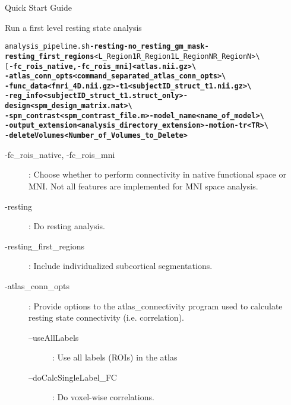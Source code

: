 \documentclass[]{report}
\begin{document}
\begin{chapter}{Quick Start Guide }
\begin{section}{Run a first level resting state analysis}
\
\begin{alltt}
analysis\_pipeline.sh  {\bf-resting  -no_resting_gm_mask -resting\_first\_regions } <L_Region1 R_Region1 L_RegionN R_RegionN>  \textbackslash \\
\hspace*{0.5in}  [ \bf-fc\_rois\_native, -fc\_rois\_mni ]  <atlas.nii.gz>  \textbackslash \\
\hspace*{0.5in}  {\bf -atlas\_conn\_opts } <command\_separated\_atlas\_conn\_opts>  \textbackslash \\
\hspace*{0.5in}  -func\_data <fmri\_4D.nii.gz>   -t1 <subjectID\_struct\_t1.nii.gz>  \textbackslash \\
\hspace*{0.5in} -reg\_info <subjectID\_struct\_t1.struct\_only> -design <spm\_design\_matrix.mat> \textbackslash  \\
\hspace*{0.5in} -spm\_contrast  <spm\_contrast\_file.m> -model\_name <name\_of\_model> \textbackslash   \\
\hspace*{0.5in} -output\_extension <analysis\_directory\_extension>  -motion -tr <TR> \textbackslash  \\
\hspace*{0.5in} -deleteVolumes <Number\_of\_Volumes\_to\_Delete>
\end{alltt}
\begin{description}
	\item [-fc\_rois\_native, -fc\_rois\_mni  ]  : Choose whether to perform connectivity in native functional space or MNI. Not all features are implemented for MNI space analysis.
	\item [-resting] :  Do resting analysis.
	\item [-resting\_first\_regions ] : Include individualized subcortical segmentations.
	\item [ -atlas\_conn\_opts ] : Provide options to the atlas\_connectivity program used to calculate resting state connectivity (i.e. correlation).
	\begin{description}
	\item [--useAllLabels  ]  : Use all labels (ROIs) in the atlas
	\item [--doCalcSingleLabel\_FC] :  Do voxel-wise correlations.
	\end{description}


\end{description}
\end{section}
\end{chapter}
\end{document}
